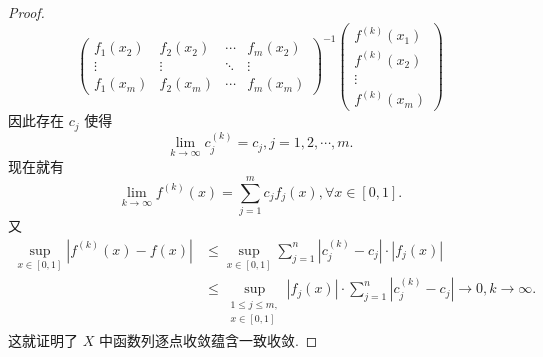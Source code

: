 \documentclass[../../main.tex]{subfiles}%
\begin{document}
\begin{proof}
\[\begin{pmatrix}
f_1(x_2) & f_2(x_2) & \cdots & f_m(x_2) \\
\vdots & \vdots & \ddots & \vdots \\
f_1(x_m) & f_2(x_m) & \cdots & f_m(x_m)
\end{pmatrix}^{-1}
\begin{pmatrix}
f^{(k)}(x_1) \\
f^{(k)}(x_2) \\
\vdots \\
f^{(k)}(x_m)
\end{pmatrix}
\]
因此存在 \( c_j \) 使得
\[
\lim_{k \to \infty} c_j^{(k)} = c_j, j = 1, 2, \cdots, m.
\]
现在就有
\[
\lim_{k \to \infty} f^{(k)}(x) = \sum_{j=1}^m c_j f_j(x), \forall x \in [0,1].
\]
又
\[
\begin{aligned}
\sup_{x \in [0,1]} \left| f^{(k)}(x) - f(x) \right| &\leqslant \sup_{x \in [0,1]} \sum_{j=1}^n \left| c_j^{(k)} - c_j \right| \cdot \left| f_j(x) \right| \\
&\leqslant \sup_{\substack{1 \leqslant j \leqslant m, \\ x \in [0,1]}} \left| f_j(x) \right| \cdot \sum_{j=1}^n \left| c_j^{(k)} - c_j \right| \to 0, k \to \infty.
\end{aligned}
\]
这就证明了 \( X \) 中函数列逐点收敛蕴含一致收敛.
\end{proof}
\end{document}
